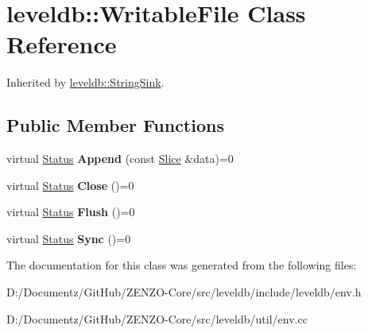 \hypertarget{classleveldb_1_1_writable_file}{}\section{leveldb\+::Writable\+File Class Reference}
\label{classleveldb_1_1_writable_file}


Inherited by \mbox{\hyperlink{classleveldb_1_1_string_sink}{leveldb\+::\+String\+Sink}}.

\subsection*{Public Member Functions}
\begin{DoxyCompactItemize}
\item 
\mbox{\label{classleveldb_1_1_writable_file_a53b41841d9577d28f65d4d90e1660de8}} 
virtual \mbox{\hyperlink{classleveldb_1_1_status}{Status}} {\bfseries Append} (const \mbox{\hyperlink{classleveldb_1_1_slice}{Slice}} \&data)=0
\item 
\mbox{\label{classleveldb_1_1_writable_file_a2efbf9c02a26028b5002df73b4393915}} 
virtual \mbox{\hyperlink{classleveldb_1_1_status}{Status}} {\bfseries Close} ()=0
\item 
\mbox{\label{classleveldb_1_1_writable_file_ab95759ad32f6a05b0ee4266969fa265e}} 
virtual \mbox{\hyperlink{classleveldb_1_1_status}{Status}} {\bfseries Flush} ()=0
\item 
\mbox{\label{classleveldb_1_1_writable_file_a2d2dcef02a2c9e71f3d39125bcd5a606}} 
virtual \mbox{\hyperlink{classleveldb_1_1_status}{Status}} {\bfseries Sync} ()=0
\end{DoxyCompactItemize}


The documentation for this class was generated from the following files\+:\begin{DoxyCompactItemize}
\item 
D\+:/\+Documentz/\+Git\+Hub/\+Z\+E\+N\+Z\+O-\/\+Core/src/leveldb/include/leveldb/env.\+h\item 
D\+:/\+Documentz/\+Git\+Hub/\+Z\+E\+N\+Z\+O-\/\+Core/src/leveldb/util/env.\+cc\end{DoxyCompactItemize}
